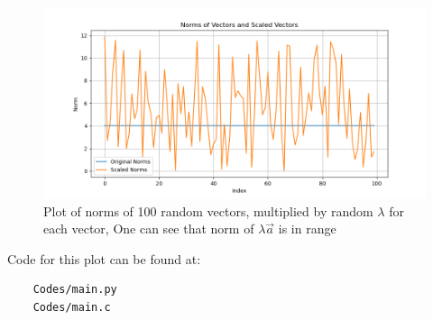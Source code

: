 \documentclass[journal]{IEEEtran}
\begin{document}
\begin{figure}[H]
	\centering
	\includegraphics[width=0.75\columnwidth]{Figures/Figure.png}
	\caption{Plot of norms of 100 random vectors, multiplied by random $\lambda$ for each vector, One can see that norm of $\lambda\vec{a}$ is in range }
	\label{fig}
\end{figure}

Code for this plot can be found at:
\begin{lstlisting}
    Codes/main.py
    Codes/main.c
\end{lstlisting}
\end{document}
